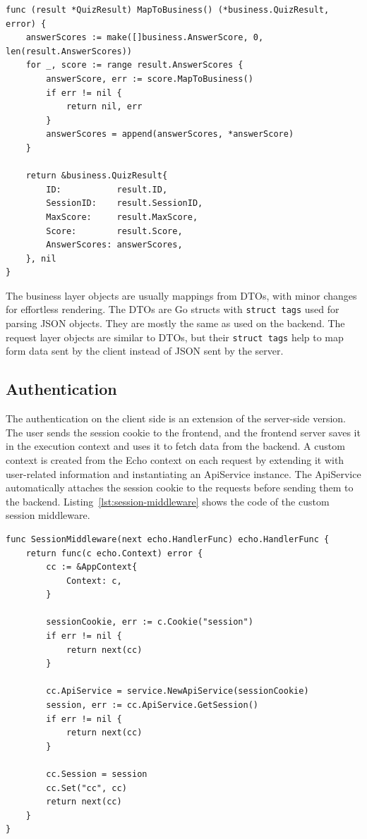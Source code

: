 \begin{lstlisting}[caption=Mapping from external to business,label=lst:mapping-example]
func (result *QuizResult) MapToBusiness() (*business.QuizResult, error) {
    answerScores := make([]business.AnswerScore, 0, len(result.AnswerScores))
    for _, score := range result.AnswerScores {
        answerScore, err := score.MapToBusiness()
        if err != nil {
            return nil, err
        }
        answerScores = append(answerScores, *answerScore)
    }

    return &business.QuizResult{
        ID:           result.ID,
        SessionID:    result.SessionID,
        MaxScore:     result.MaxScore,
        Score:        result.Score,
        AnswerScores: answerScores,
    }, nil
}
\end{lstlisting}

The business layer objects are usually mappings from DTOs, with minor changes for effortless rendering. The DTOs are Go structs with \texttt{struct tags} used for parsing JSON objects. They are mostly the same as used on the backend. The request layer objects are similar to DTOs, but their \texttt{struct tags} help to map form data sent by the client instead of JSON sent by the server.

\subsection{Authentication}

The authentication on the client side is an extension of the server-side version. The user sends the session cookie to the frontend, and the frontend server saves it in the execution context and uses it to fetch data from the backend. A custom context is created from the Echo context on each request by extending it with user-related information and instantiating an ApiService instance. The ApiService automatically attaches the session cookie to the requests before sending them to the backend. Listing~\ref{lst:session-middleware} shows the code of the custom session middleware.

\begin{lstlisting}[caption=Session middleware code,label=lst:session-middleware]
func SessionMiddleware(next echo.HandlerFunc) echo.HandlerFunc {
	return func(c echo.Context) error {
		cc := &AppContext{
			Context: c,
		}

		sessionCookie, err := c.Cookie("session")
		if err != nil {
			return next(cc)
		}

		cc.ApiService = service.NewApiService(sessionCookie)
		session, err := cc.ApiService.GetSession()
		if err != nil {
			return next(cc)
		}

		cc.Session = session
		cc.Set("cc", cc)
		return next(cc)
	}
}
\end{lstlisting}


